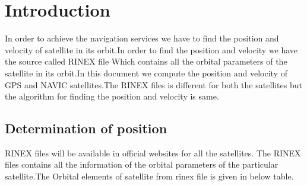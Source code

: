 \section{Introduction}
In order to achieve the navigation services we have to find the position and velocity of satellite in its orbit.In order to find the position and velocity we have the source called RINEX file Which contains all the orbital parameters of the satellite in its orbit.In this document we  compute the position and velocity of GPS and NAVIC satellites.The RINEX files is different for both the satellites but the algorithm for finding the position and velocity is same.
\subsection{Determination of position}
RINEX files will be available in official websites for all the satellites.
The RINEX files contains all the information of the orbital parameters of the particular satellite.The Orbital elements of satellite from rinex file is given in below table.
